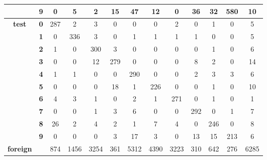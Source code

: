\begin{table}[htp]
{\begin{tabular}{|c|c|c|c|c|c|c|c|c|c|c|c|c|}
			& \textbf{9} & 0          & 5          & 2          & 15         & 47         & 12         & 0          & 36         & 32         & 580        & 10               \\ \hline
			\multirow{10}{*}{\textbf{test}}     & \textbf{0} & 287        & 2          & 3          & 0          & 0          & 0          & 2          & 0          & 1          & 0          & 5                \\ \cline{2-13} 
			& \textbf{1} & 0          & 336        & 3          & 0          & 1          & 1          & 1          & 1          & 0          & 0          & 5                \\ \cline{2-13} 
			& \textbf{2} & 1          & 0          & 300        & 3          & 0          & 0          & 0          & 0          & 1          & 0          & 6                \\ \cline{2-13} 
			& \textbf{3} & 0          & 0          & 12         & 279        & 0          & 0          & 0          & 8          & 2          & 0          & 14               \\ \cline{2-13} 
			& \textbf{4} & 1          & 1          & 0          & 0          & 290        & 0          & 0          & 2          & 3          & 3          & 6                \\ \cline{2-13} 
			& \textbf{5} & 0          & 0          & 0          & 18         & 1          & 226        & 0          & 0          & 1          & 0          & 10               \\ \cline{2-13} 
			& \textbf{6} & 4          & 3          & 1          & 0          & 2          & 1          & 271        & 0          & 1          & 0          & 1                \\ \cline{2-13} 
			& \textbf{7} & 0          & 0          & 1          & 3          & 6          & 0          & 0          & 292        & 0          & 1          & 7                \\ \cline{2-13} 
			& \textbf{8} & 26         & 2          & 4          & 2          & 1          & 7          & 4          & 0          & 246        & 0          & 8                \\ \cline{2-13} 
			& \textbf{9} & 0          & 0          & 0          & 3          & 17         & 3          & 0          & 13         & 15         & 213        & 6                \\ \hline
			\textbf{foreign}                    & \textbf{}  & 874        & 1456       & 3254       & 361        & 5312       & 4390       & 3223       & 310        & 642        & 276        & 6285             \\ \hline
		\end{tabular}
	}
\end{table}

